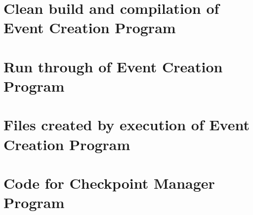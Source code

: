 \documentclass[a4paper,12pt]{article}
\begin{document}
\section{Clean build and compilation of Event Creation Program}


\section{Run through of Event Creation Program}

\section{Files created by execution of Event Creation Program}

\section{Code for Checkpoint Manager Program}










\end{document}
